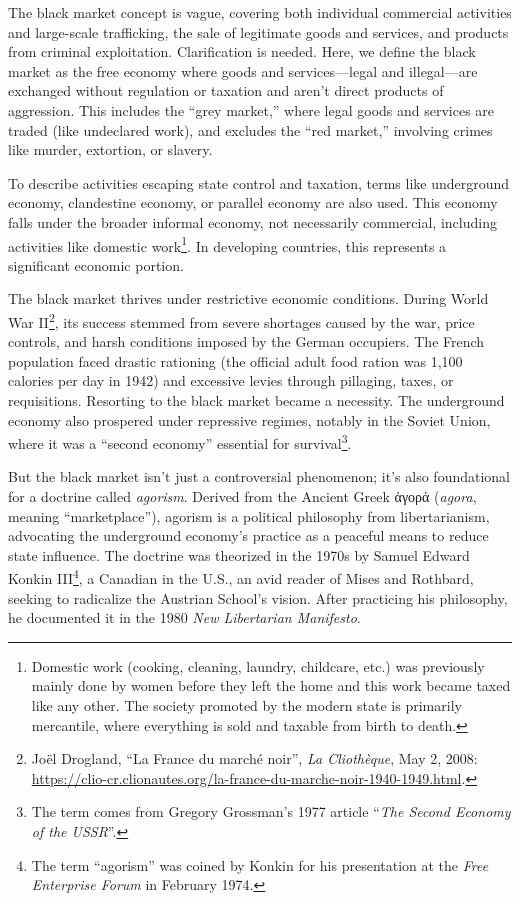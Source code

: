 \documentclass[
  a5paper,
  smalldemyvopaper,10pt,twoside,onecolumn,openright,extrafontsizes,hidelinks]{memoir}
\begin{document}
The black market concept is vague, covering both individual commercial
activities and large-scale trafficking, the sale of legitimate goods and
services, and products from criminal exploitation. Clarification is
needed. Here, we define the black market as the free economy where goods
and services---legal and illegal---are exchanged without regulation or
taxation and aren't direct products of aggression. This includes the
``grey market,'' where legal goods and services are traded (like
undeclared work), and excludes the ``red market,'' involving crimes like
murder, extortion, or slavery.

To describe activities escaping state control and taxation, terms like
underground economy, clandestine economy, or parallel economy are also
used. This economy falls under the broader informal economy, not
necessarily commercial, including activities like domestic
work\footnote{Domestic work (cooking, cleaning, laundry, childcare,
  etc.) was previously mainly done by women before they left the home
  and this work became taxed like any other. The society promoted by the
  modern state is primarily mercantile, where everything is sold and
  taxable from birth to death.}. In developing countries, this
represents a significant economic portion.

The black market thrives under restrictive economic conditions. During
World War II\footnote{Joël Drogland, ``La France du marché noir'',
  \emph{La Cliothèque}, May 2, 2008:
  \url{https://clio-cr.clionautes.org/la-france-du-marche-noir-1940-1949.html}.},
its success stemmed from severe shortages caused by the war, price
controls, and harsh conditions imposed by the German occupiers. The
French population faced drastic rationing (the official adult food
ration was 1,100 calories per day in 1942) and excessive levies through
pillaging, taxes, or requisitions. Resorting to the black market became
a necessity. The underground economy also prospered under repressive
regimes, notably in the Soviet Union, where it was a ``second economy''
essential for survival\footnote{The term comes from Gregory Grossman's
  1977 article ``\emph{The Second Economy of the USSR}''.}.

But the black market isn't just a controversial phenomenon; it's also
foundational for a doctrine called \emph{agorism}. Derived from the
Ancient Greek ἀγορά (\emph{agora}, meaning ``marketplace''), agorism is
a political philosophy from libertarianism, advocating the underground
economy's practice as a peaceful means to reduce state influence. The
doctrine was theorized in the 1970s by Samuel Edward Konkin
III\footnote{The term ``agorism'' was coined by Konkin for his
  presentation at the \emph{Free Enterprise Forum} in February 1974.}, a
Canadian in the U.S., an avid reader of Mises and Rothbard, seeking to
radicalize the Austrian School's vision. After practicing his
philosophy, he documented it in the 1980 \emph{New Libertarian
Manifesto}.
\end{document}
